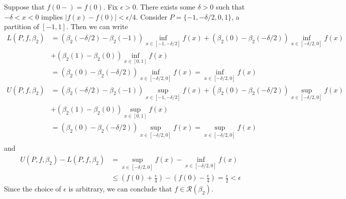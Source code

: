 \documentclass{scrartcl}
\begin{document}
Suppose that \(f(0-) = f(0)\).
Fix \(\epsilon > 0\).
There exists some \(\delta > 0\) such that \(-\delta < x < 0\) implies \(|f(x) - f(0)| < \epsilon / 4\).
Consider \(P = \{-1, -\delta / 2, 0, 1\}\), a partition of \([-1, 1]\).
Then we can write
\begin{align*}
  L(P, f, \beta_2) &= (\beta_2(-\delta / 2) - \beta_2(-1)) \inf_{x \in [-1, -\delta / 2]} f(x) + (\beta_2(0) - \beta_2(-\delta / 2)) \inf_{x \in [-\delta / 2, 0]} f(x) \\
                   &+ (\beta_2(1) - \beta_2(0)) \inf_{x \in [0, 1]} f(x) \\
                   &= (\beta_2(0) - \beta_2(-\delta / 2)) \inf_{x \in [-\delta / 2, 0]} f(x) = \inf_{x \in [-\delta / 2, 0]} f(x) \\
  U(P, f, \beta_2) &= (\beta_2(-\delta / 2) - \beta_2(-1)) \sup_{x \in [-1, -\delta / 2]} f(x) + (\beta_2(0) - \beta_2(-\delta / 2)) \sup_{x \in [-\delta / 2, 0]} f(x) \\
                   &+ (\beta_2(1) - \beta_2(0)) \sup_{x \in [0, 1]} f(x) \\
                   &= (\beta_2(0) - \beta_2(-\delta / 2)) \sup_{x \in [-\delta / 2, 0]} f(x) = \sup_{x \in [-\delta / 2, 0]} f(x) \\
\end{align*}
and
\begin{align*}
  U(P, f, \beta_2) - L(P, f, \beta_2)
  &= \sup_{x \in [-\delta / 2, 0]} f(x) - \inf_{x \in [-\delta / 2, 0]} f(x) \\
  &\leq \left( f(0) + \frac{\epsilon}{4} \right) - \left( f(0) - \frac{\epsilon}{4} \right)
  = \frac{\epsilon}{2}
  < \epsilon
\end{align*}
Since the choice of \(\epsilon\) is arbitrary, we can conclude that \(f \in \mathscr{R}(\beta_2)\).
\end{document}
